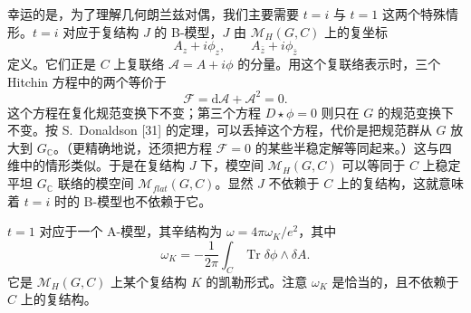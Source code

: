\documentclass[11pt,a4paper,UTF8]{ctexart}
\begin{document}
幸运的是，为了理解几何朗兰兹对偶，我们主要需要 $t=i$ 与 $t=1$ 这两个特殊情形。$t=i$ 对应于复结构 $J$ 的 B-模型，$J$ 由 $\mathcal{M}_{H}(G,C)$ 上的复坐标
\[
    A_{z}+i\phi_{z},\qquad A_{\bar z}+i\phi_{\bar z}
\]
定义。它们正是 $C$ 上复联络 $\mathcal{A}=A+i\phi$ 的分量。用这个复联络表示时，三个 Hitchin 方程中的两个等价于
\[
    \mathcal{F}=\mathrm{d}\mathcal{A}+\mathcal{A}^{2}=0.
\]
这个方程在复化规范变换下不变；第三个方程 $D\star\phi=0$ 则只在 $G$ 的规范变换下不变。按 S.~Donaldson [31] 的定理，可以丢掉这个方程，代价是把规范群从 $G$ 放大到 $G_{\mathbb{C}}$。（更精确地说，还须把方程 $\mathcal{F}=0$ 的某些半稳定解等同起来。）这与四维中的情形类似。于是在复结构 $J$ 下，模空间 $\mathcal{M}_{H}(G,C)$ 可以等同于 $C$ 上稳定平坦 $G_{\mathbb{C}}$ 联络的模空间 $\mathcal{M}_{flat}(G,C)$。显然 $J$ 不依赖于 $C$ 上的复结构，这就意味着 $t=i$ 时的 B-模型也不依赖于它。




    $t=1$ 对应于一个 A-模型，其辛结构为 $\omega=4\pi\omega_{K}/e^{2}$，其中
\[
    \omega_{K}=-\frac{1}{2\pi}\int_{C}\operatorname{Tr}\delta\phi\wedge\delta A.
\]
它是 $\mathcal{M}_{H}(G,C)$ 上某个复结构 $K$ 的凯勒形式。注意 $\omega_{K}$ 是恰当的，且不依赖于 $C$ 上的复结构。
\end{document}
